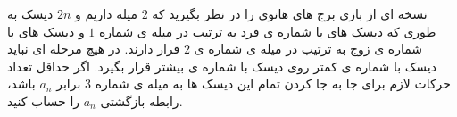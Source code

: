 \exercise
نسخه ای از بازی برج های هانوی را در نظر بگیرید که 
$2$
میله داریم و 
$2n$
 دیسک به طوری که دیسک های با
شماره ی فرد به ترتیب در میله ی شماره 
$1$
 و دیسک های با شماره ی زوج به ترتیب در میله ی شماره ی 
$2$
 قرار دارند.
در هیچ مرحله ای نباید دیسک با شماره ی کمتر روی دیسک با شماره ی بیشتر قرار بگیرد. اگر حداقل تعداد حرکات لازم برای جا به جا کردن تمام این دیسک ها به میله ی شماره 
$3$
برابر 
$a_n$
 باشد، رابطه بازگشتی 
$a_n$ 
  را حساب کنید.